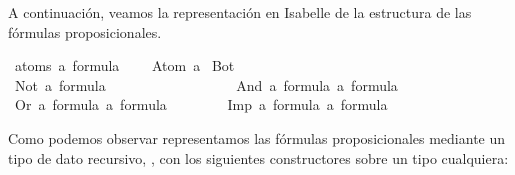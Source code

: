\begin{isabellebody}
\begin{isamarkuptext}
  A continuación, veamos la representación en Isabelle de la estructura
  de las fórmulas proposicionales.%
\end{isamarkuptext}\isamarkuptrue%
\isamarkupfalse%
\ {\isacharparenleft}atoms{\isacharcolon}\ {\isacharprime}a{\isacharparenright}\ formula\ {\isacharequal}\ \isanewline
\ \ Atom\ {\isacharprime}a\isanewline
{\isacharbar}\ Bot\ \ \ \ \ \ \ \ \ \ \ \ \ \ \ \ \ \ \ \ \ \ \ \ \ \ \ \ \ \ {\isacharparenleft}{\isachardoublequoteopen}{\isasymbottom}{\isachardoublequoteclose}{\isacharparenright}\ \ \isanewline
{\isacharbar}\ Not\ {\isachardoublequoteopen}{\isacharprime}a\ formula{\isachardoublequoteclose}\ \ \ \ \ \ \ \ \ \ \ \ \ \ \ \ \ {\isacharparenleft}{\isachardoublequoteopen}\isactrlbold {\isasymnot}{\isachardoublequoteclose}{\isacharparenright}\isanewline
{\isacharbar}\ And\ {\isachardoublequoteopen}{\isacharprime}a\ formula{\isachardoublequoteclose}\ {\isachardoublequoteopen}{\isacharprime}a\ formula{\isachardoublequoteclose}\ \ \ \ {\isacharparenleft}\ {\isachardoublequoteopen}\isactrlbold {\isasymand}{\isachardoublequoteclose}\ {}{}{\isacharparenright}\isanewline
{\isacharbar}\ Or\ {\isachardoublequoteopen}{\isacharprime}a\ formula{\isachardoublequoteclose}\ {\isachardoublequoteopen}{\isacharprime}a\ formula{\isachardoublequoteclose}\ \ \ \ \ {\isacharparenleft}\ {\isachardoublequoteopen}\isactrlbold {\isasymor}{\isachardoublequoteclose}\ {}{}{\isacharparenright}\isanewline
{\isacharbar}\ Imp\ {\isachardoublequoteopen}{\isacharprime}a\ formula{\isachardoublequoteclose}\ {\isachardoublequoteopen}{\isacharprime}a\ formula{\isachardoublequoteclose}\ \ \ \ {\isacharparenleft}\ {\isachardoublequoteopen}\isactrlbold {\isasymrightarrow}{\isachardoublequoteclose}\ {}{}{\isacharparenright}%
\begin{isamarkuptext}%
Como podemos observar representamos las fórmulas proposicionales
  mediante un tipo de dato recursivo, , con los 
  siguientes constructores sobre un tipo cualquiera:


\end{isamarkuptext}
\end{isabellebody}
